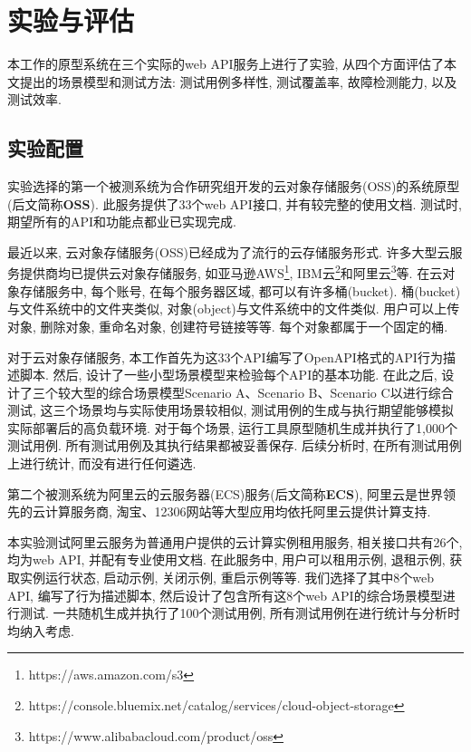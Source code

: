 \chapter{实验与评估}

    本工作的原型系统在三个实际的web API服务上进行了实验, 从四个方面评估了本文提出的场景模型和测试方法: 测试用例多样性, 测试覆盖率, 故障检测能力, 以及测试效率.
    
    \section{实验配置}
        实验选择的第一个被测系统为合作研究组开发的云对象存储服务(OSS)的系统原型(后文简称\textbf{OSS}). 此服务提供了33个web API接口, 并有较完整的使用文档. 测试时, 期望所有的API和功能点都业已实现完成.
        
        最近以来, 云对象存储服务(OSS)已经成为了流行的云存储服务形式. 许多大型云服务提供商均已提供云对象存储服务, 如亚马逊AWS\footnote{https://aws.amazon.com/s3}, IBM云\footnote{ https://console.bluemix.net/catalog/services/cloud-object-storage}和阿里云\footnote{ https://www.alibabacloud.com/product/oss}等. 在云对象存储服务中, 每个账号, 在每个服务器区域, 都可以有许多桶(bucket). 桶(bucket)与文件系统中的文件夹类似, 对象(object)与文件系统中的文件类似. 用户可以上传对象, 删除对象, 重命名对象, 创建符号链接等等. 每个对象都属于一个固定的桶.
        
        对于云对象存储服务, 本工作首先为这33个API编写了OpenAPI格式的API行为描述脚本. 然后, 设计了一些小型场景模型来检验每个API的基本功能. 在此之后, 设计了三个较大型的综合场景模型Scenario A、Scenario B、Scenario C以进行综合测试, 这三个场景均与实际使用场景较相似, 测试用例的生成与执行期望能够模拟实际部署后的高负载环境. 对于每个场景, 运行工具原型随机生成并执行了1,000个测试用例. 所有测试用例及其执行结果都被妥善保存. 后续分析时, 在所有测试用例上进行统计, 而没有进行任何遴选.
        
        第二个被测系统为阿里云的云服务器(ECS)服务(后文简称\textbf{ECS}), 阿里云是世界领先的云计算服务商, 淘宝、12306网站等大型应用均依托阿里云提供计算支持. 
        
        本实验测试阿里云服务为普通用户提供的云计算实例租用服务, 相关接口共有26个, 均为web API, 并配有专业使用文档. 在此服务中, 用户可以租用示例, 退租示例, 获取实例运行状态, 启动示例, 关闭示例, 重启示例等等. 我们选择了其中8个web API, 编写了行为描述脚本, 然后设计了包含所有这8个web API的综合场景模型进行测试. 一共随机生成并执行了100个测试用例, 所有测试用例在进行统计与分析时均纳入考虑.
        
